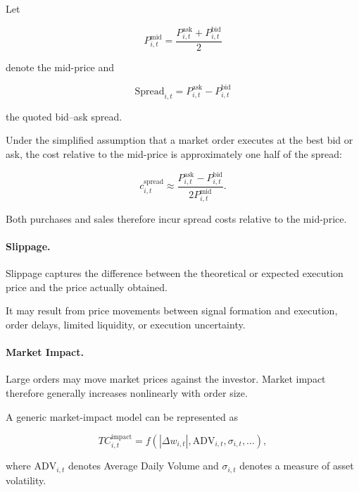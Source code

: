 \documentclass[11pt,a4paper]{article}
\begin{document}
Let

\begin{equation}
P_{i,t}^{\mathrm{mid}}
=
\frac{
P_{i,t}^{\mathrm{ask}}
+
P_{i,t}^{\mathrm{bid}}
}{2}
\end{equation}

denote the mid-price and

\begin{equation}
\mathrm{Spread}_{i,t}
=
P_{i,t}^{\mathrm{ask}}
-
P_{i,t}^{\mathrm{bid}}
\end{equation}

the quoted bid--ask spread.

Under the simplified assumption that a market order executes at the best bid
or ask, the cost relative to the mid-price is approximately one half of the
spread:

\begin{equation}
c_{i,t}^{\mathrm{spread}}
\approx
\frac{
P_{i,t}^{\mathrm{ask}}
-
P_{i,t}^{\mathrm{bid}}
}{
2P_{i,t}^{\mathrm{mid}}
}.
\end{equation}

Both purchases and sales therefore incur spread costs relative to the
mid-price.


\paragraph{Slippage.}

Slippage captures the difference between the theoretical or expected execution
price and the price actually obtained.

It may result from price movements between signal formation and execution,
order delays, limited liquidity, or execution uncertainty.


\paragraph{Market Impact.}

Large orders may move market prices against the investor. Market impact
therefore generally increases nonlinearly with order size.

A generic market-impact model can be represented as

\begin{equation}
TC_{i,t}^{\mathrm{impact}}
=
f
\left(
|\Delta w_{i,t}|,
\mathrm{ADV}_{i,t},
\sigma_{i,t},
\ldots
\right),
\end{equation}

where $\mathrm{ADV}_{i,t}$ denotes Average Daily Volume and $\sigma_{i,t}$
denotes a measure of asset volatility.
\end{document}
